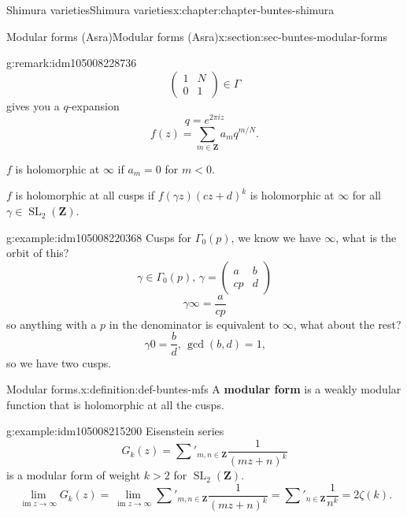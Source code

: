 \documentclass[oneside,10pt,]{book}
\newcommand{\terminology}[1]{\textbf{#1}}
\numberwithin{equation}{section}
\newcommand{\ZZ}{\mathbf{Z}}
\DeclareMathOperator{\im}{im}
\DeclareMathOperator{\SL}{SL}
\newcommand{\lt}{<}
\newcommand{\gt}{>}
\newcommand{\amp}{&}
\begin{document}
\begin{chapterptx}{Shimura varieties}{}{Shimura varieties}{}{}{x:chapter:chapter-buntes-shimura}
\begin{sectionptx}{Modular forms (Asra)}{}{Modular forms (Asra)}{}{}{x:section:sec-buntes-modular-forms}
\begin{remark}{}{g:remark:idm105008228736}
\begin{equation*}
\begin{pmatrix} 1\amp N \\ 0 \amp 1 \end{pmatrix} \in \Gamma
\end{equation*}
gives you a \(q\)-expansion%
\begin{equation*}
q=  e^{2\pi i z}
\end{equation*}
%
\begin{equation*}
f(z) = \sum_{m\in \ZZ} a_m  q^{m/N}\text{.}
\end{equation*}
%
\par
\(f\) is holomorphic at \(\infty\) if \(a_m  = 0\) for \(m \lt 0\).%
\par
\(f\) is holomorphic at all cusps if \(f(\gamma z)(cz+d)^k\) is holomorphic at \(\infty\) for all \(\gamma \in \SL_2(\ZZ)\).%
\end{remark}
\begin{example}{}{g:example:idm105008220368}%
Cusps for \(\Gamma_0(p)\), we know we have \(\infty\), what is the orbit of this?%
\begin{equation*}
\gamma\in \Gamma_0(p),\, \gamma  =  \begin{pmatrix} a\amp b \\ cp \amp d    \end{pmatrix}
\end{equation*}
%
\begin{equation*}
\gamma \infty  = \frac{a}{cp}
\end{equation*}
so anything with  a \(p\) in the denominator is equivalent to \(\infty\), what about the rest?%
\begin{equation*}
\gamma 0  = \frac{b}{d}, \, \gcd(b,d)  =1\text{,}
\end{equation*}
so we have two cusps.%
\end{example}
\begin{definition}{Modular forms.}{x:definition:def-buntes-mfs}%
A \terminology{modular form} is  a weakly modular function that is holomorphic at all the cusps.%
\end{definition}
\begin{example}{}{g:example:idm105008215200}%
Eisenstein series%
\begin{equation*}
G_k(z) = \sum'_{m,n\in \ZZ} \frac{1}{(mz+n)^k}
\end{equation*}
is a modular form of weight \(k \gt 2\) for \(\SL_2(\ZZ)\).%
\begin{equation*}
\lim_{\im z\to \infty} G_k(z) = \lim_{\im z\to \infty} \sum'_{m,n\in \ZZ} \frac{1}{(mz+n)^k} = \sum'_{n\in \ZZ} \frac{1}{n^k} = 2\zeta(k)\text{.}

\end{equation*}
\end{example}
\end{sectionptx}
\end{chapterptx}
\end{document}
